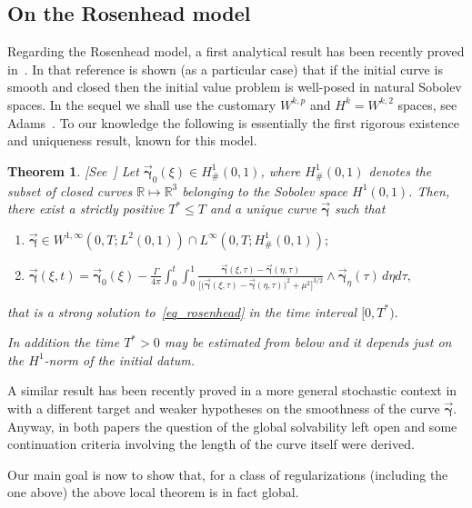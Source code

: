 \documentclass[a4paper,11pt]{article}
\numberwithin{equation}{section}
\newtheorem{theorem}{Theorem}
\newcommand{\R}{\mathbb{R}}
\newcommand{\bgamma}{\mbox{$\vec{\boldsymbol \gamma}$}}
\begin{document}
\subsection{On the Rosenhead model}%
Regarding the Rosenhead model, a first analytical result has been
recently proved in~\cite{bb}. In that reference is shown (as a
particular case) that if the initial curve is smooth and closed then
the initial value problem is well-posed in natural Sobolev spaces. In
the sequel we shall use the customary $W^{k,p}$ and $H^k=W^{k,2}$
spaces, see Adams~\cite{Ada75}. To our knowledge the following is
essentially the first rigorous existence and uniqueness result, known
for this model. 
\begin{theorem}\label{theorem_existence}[See~\cite{bb}]
Let $\bgamma_0(\xi)\in H^1_\#(0,1)$, where $H^1_\#(0,1)$ denotes the
subset of closed curves $\R\mapsto\R^3$ belonging to the Sobolev space
$H^1(0,1)$. Then, there exist a strictly positive $T^*\leq T$ and a
unique curve $\bgamma$ such that
  \begin{enumerate}
  \item[a)] $\bgamma\in W^{1,\infty}(0,T;L^2(0,1))\cap
 L^\infty(0,T;H^1_\#(0,1));$
   \item[b)]
     ${\displaystyle\bgamma(\xi,t)=\bgamma_0(\xi)-
\frac{\Gamma}{4\pi}\int_0^t\int_0^1{\frac{\bgamma(\xi,\tau)-
\bgamma(\eta,\tau)}{\big[\big(\bgamma(\xi,\tau)-   
\bgamma(\eta,\tau)\big)^2+\mu^2\big]^{3/2}}
\wedge\bgamma_\eta(\tau)\,d\eta d\tau,}}$
  \end{enumerate}
that is a strong solution to~\eqref{eq_rosenhead} in the time interval
$[0,T^*).$\par   
%
In addition the time $T^*>0$ may be estimated from below and it
depends just on the $H^1$-norm of the initial datum.
\end{theorem}
A similar result has been recently proved in a more general stochastic
context in~\cite{BGR} with a different target and weaker hypotheses on
the smoothness of the curve $\bgamma$. Anyway, in both papers the
question of the global solvability left open and some continuation
criteria involving the length of the curve itself were derived.\par
%
Our main goal is now to show that, for a  class of regularizations
(including the one above)  the above local theorem is in fact global.
\end{document}
